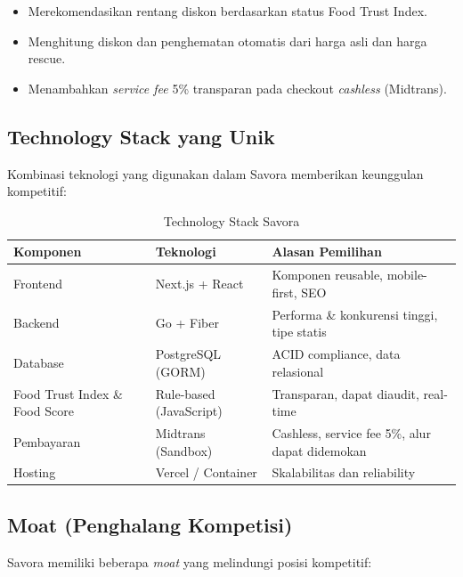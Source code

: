 \begin{itemize}[leftmargin=*]
    \item Merekomendasikan rentang diskon berdasarkan status Food Trust Index.
    \item Menghitung diskon dan penghematan otomatis dari harga asli dan harga rescue.
    \item Menambahkan \textit{service fee} 5\% transparan pada checkout \textit{cashless} (Midtrans).
\end{itemize}

\subsection{Technology Stack yang Unik}

Kombinasi teknologi yang digunakan dalam Savora memberikan keunggulan kompetitif:

\begin{table}[htbp]
\centering
\caption{Technology Stack Savora}
\label{tab:tech_stack}
\begin{tabularx}{\textwidth}{|l|Y|Y|}
\hline
\textbf{Komponen} & \textbf{Teknologi} & \textbf{Alasan Pemilihan} \\
\hline
Frontend & Next.js + React & Komponen reusable, mobile-first, SEO \\
\hline
Backend & Go + Fiber & Performa \& konkurensi tinggi, tipe statis \\
\hline
Database & PostgreSQL (GORM) & ACID compliance, data relasional \\
\hline
Food Trust Index \& Food Score & Rule-based (JavaScript) & Transparan, dapat diaudit, real-time \\
\hline
Pembayaran & Midtrans (Sandbox) & Cashless, service fee 5\%, alur dapat didemokan \\
\hline
Hosting & Vercel / Container & Skalabilitas dan reliability \\
\hline
\end{tabularx}
\end{table}

\subsection{Moat (Penghalang Kompetisi)}

Savora memiliki beberapa \textit{moat} yang melindungi posisi kompetitif:

